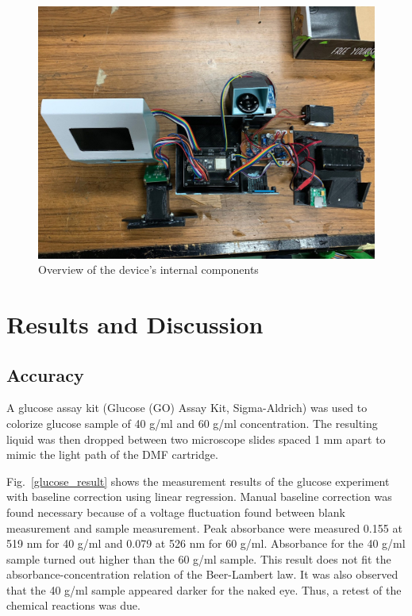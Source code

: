 \documentclass[conference]{IEEEtran}
\begin{document}
    \begin{figure}[htbp]
    \centerline{\includegraphics[scale=0.15]{hardware-2.jpg}}
    \caption{Overview of the device's internal components}
    \label{hardware}
    \end{figure}

\section{Results and Discussion}
\subsection{Accuracy}
A glucose assay kit (Glucose (GO) Assay Kit, Sigma-Aldrich) was used to colorize glucose sample of 40 {\textmu}g/ml and 60 {\textmu}g/ml concentration.
The resulting liquid was then dropped between two microscope slides spaced 1 mm apart to mimic the light path of the DMF cartridge.

Fig.~\ref{glucose_result} shows the measurement results of the glucose experiment with baseline correction using linear regression.
Manual baseline correction was found necessary because of a voltage fluctuation found between blank measurement and sample measurement.
Peak absorbance were measured 0.155 at 519 nm for 40 {\textmu}g/ml and 0.079 at 526 nm for 60 {\textmu}g/ml.
Absorbance for the 40 {\textmu}g/ml sample turned out higher than the 60 {\textmu}g/ml sample.
This result does not fit the absorbance-concentration relation of the Beer-Lambert law.
It was also observed that the 40 {\textmu}g/ml sample appeared darker for the naked eye.
Thus, a retest of the chemical reactions was due.
\end{document}
